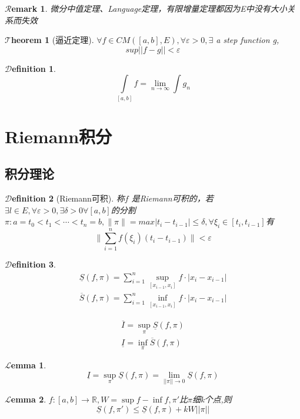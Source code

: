\documentclass[hyperfer,UTF8,a4paper,12pt]{article}
\theoremstyle{plain}
\newtheorem{Thm}{$\mathcal{T}$heorem}
\newtheorem*{Lem}{$\mathcal{L}$emma}
\newtheorem*{Remark}{$\mathcal{R}$emark}
\newtheorem{Def}{{$\mathcal{D}$efinition}}[section]
\begin{document}
\begin{Remark}
	微分中值定理、Language定理，有限增量定理都因为E中没有大小关系而失效
\end{Remark}

\begin{Thm}[逼近定理]
	$ \forall f\in CM([a,b],E) ,\forall\varepsilon>0,\exists $ a step function g,\[ sup||f-g||<\varepsilon \]
\end{Thm}

\begin{Def}
	\[\int\limits_{[a,b]}f=\lim\limits_{n\to\infty}\int g_n   \]
\end{Def}



\section{Riemann积分}
\subsection{积分理论}
\begin{Def}[Riemann可积]
	称$ f $ 是Riemann可积的，若$ \exists l\in E ,\forall\varepsilon>0,\exists\delta>0\forall[a,b] $的分割$ \pi:a=t_0<t_1<\cdots<t_n=b ,\|\pi\|=max{|t_i-t_{i-1}|}\leqslant\delta,\forall \xi_i\in[t_i,t_{i-1}]$有
	\[  \|  \sum\limits_{i=1}^nf(\xi_i)(t_i-t_{i-1})  \|<\varepsilon  \]
\end{Def}

\begin{Def}
	\begin{align*}
		\underline{S}(f,\pi)=\sum\limits_{i=1}^n \sup\limits_{[x_{i-1},x_i]}f\cdot |x_i-x_{i-1}|   \\
		\overline{S}(f,\pi)=\sum\limits_{i=1}^n \inf\limits_{[x_{i-1},x_i]}f\cdot |x_i-x_{i-1}| 
	\end{align*}
	
	\begin{align*}
		\overline{I}=\sup\limits_{\pi}\underline{S}(f,\pi)   \\
		\underline{I}=\inf\limits_{\pi}\overline{S}(f,\pi) 
	\end{align*}
\end{Def}
\begin{Lem}
	\[ \underline{I}=\sup\limits_{\pi}\underline{S}(f,\pi)=\lim\limits_{||\pi||\to0}\underline{S}(f,\pi)   \]
\end{Lem}
\begin{Lem}
	$ f:[a,b]\to\mathbb{R},W=\sup f-\inf f ,\pi'$比$ \pi $细k个点,则
	\[  \underline{S}(f,\pi')\leqslant\underline{S}(f,\pi)+kW||\pi||   \]
\end{Lem}
\end{document}
